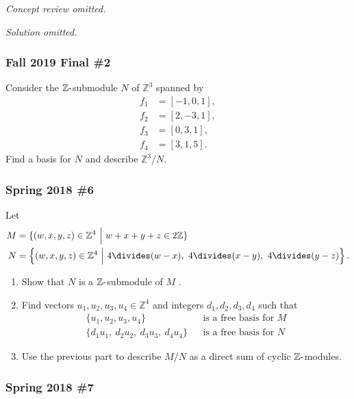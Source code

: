 \emph{Concept review omitted.}

\emph{Solution omitted.}

\hypertarget{fall-2019-final-2}{%
\subsubsection{Fall 2019 Final \#2}\label{fall-2019-final-2}}

Consider the \({\mathbb{Z}}{\hbox{-}}\)submodule \(N\) of
\({\mathbb{Z}}^3\) spanned by
\begin{align*}
f_1 &= [-1, 0, 1], \\
f_2 &= [2,-3,1], \\
f_3 &= [0, 3, 1], \\
f_4 &= [3,1,5]
.\end{align*}
Find a basis for \(N\) and describe \({\mathbb{Z}}^3/N\).

\hypertarget{spring-2018-6}{%
\subsubsection{Spring 2018 \#6}\label{spring-2018-6}}

Let
\begin{align*}
M &= \{(w, x, y, z) \in {\mathbb{Z}}^4 {~\mathrel{\Big\vert}~}w + x + y + z \in 2{\mathbb{Z}}\} \\
N &= \left\{{
(w, x, y, z) \in {\mathbb{Z}}^4 {~\mathrel{\Big\vert}~}4\divides (w - x),~ 4\divides (x - y),~ 4\divides ( y - z)
}\right\}
.\end{align*}

\begin{enumerate}
\def\labelenumi{\alph{enumi}.}
\item
  Show that \(N\) is a \({\mathbb{Z}}{\hbox{-}}\)submodule of \(M\) .
\item
  Find vectors \(u_1 , u_2 , u_3 , u_4 \in {\mathbb{Z}}^4\) and integers
  \(d_1 , d_2 , d_3 , d_4\) such that
  \begin{align*}
  \{
  u_1 , u_2 , u_3 , u_4 
  \} 
  && \text{is a free basis for }M
  \\
  \{
  d_1 u_1,~ d_2 u_2,~ d_3 u_3,~ d_4 u_4 
  \}
  && \text{is a free basis for }N
  \end{align*}
\item
  Use the previous part to describe \(M/N\) as a direct sum of cyclic
  \({\mathbb{Z}}{\hbox{-}}\)modules.
\end{enumerate}

\hypertarget{spring-2018-7}{%
\subsubsection{Spring 2018 \#7}\label{spring-2018-7}}

